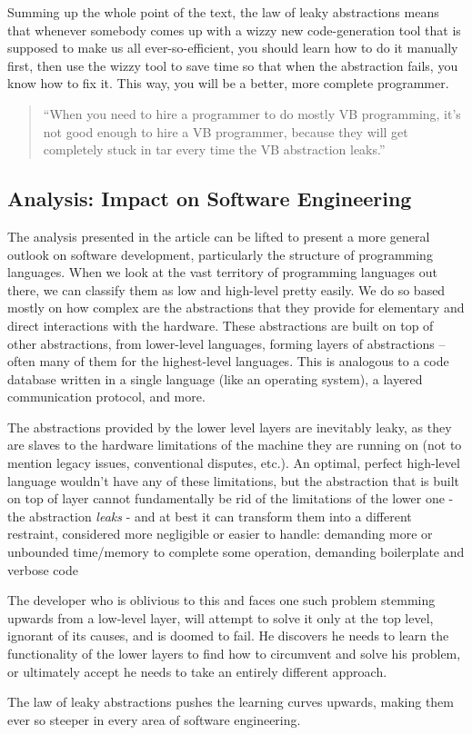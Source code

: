 \documentclass[compilation.tex]{subfiles}
\begin{document}
Summing up the whole point of the text, the law of leaky abstractions means that whenever somebody comes up with a wizzy new code-generation tool that is supposed to make us all ever-so-efficient, you should learn how to do it manually first, then use the wizzy tool to save time so that when the abstraction fails, you know how to fix it.
This way, you will be a better, more complete programmer.

\begin{quote}
``When you need to hire a programmer to do mostly VB programming, it’s not good enough to hire a VB programmer, because they will get completely stuck in tar every time the VB abstraction leaks.''
\end{quote}

\subsection{Analysis: Impact on Software Engineering}

The analysis presented in the article can be lifted to present a more general outlook on software development, particularly the structure of programming languages.
When we look at the vast territory of programming languages out there, we can classify them as low and high-level pretty easily.
We do so based mostly on how complex are the abstractions that they provide for elementary and direct interactions with the hardware.
These abstractions are built on top of other abstractions, from lower-level languages, forming layers of abstractions -- often many of them for the highest-level languages.
This is analogous to a code database written in a single language (like an operating system), a layered communication protocol, and more.

The abstractions provided by the lower level layers are inevitably leaky, as they are slaves to the hardware limitations of the machine they are running on (not to mention legacy issues, conventional disputes, etc.).
An optimal, perfect high-level language wouldn’t have any of these limitations, but the abstraction that is built on top of layer cannot fundamentally be rid of the limitations of the lower one - the abstraction \emph{leaks} - and at best it can transform them into a different restraint, considered more negligible or easier to handle: demanding more or unbounded time/memory to complete some operation, demanding boilerplate and verbose code\textellipsis

The developer who is oblivious to this and faces one such problem stemming upwards from a low-level layer, will attempt to solve it only at the top level, ignorant of its causes, and is doomed to fail.
He discovers he needs to learn the functionality of the lower layers to find how to circumvent and solve his problem, or ultimately accept he needs to take an entirely different approach.

The law of leaky abstractions pushes the learning curves upwards, making them ever so steeper in every area of software engineering.
\end{document}
